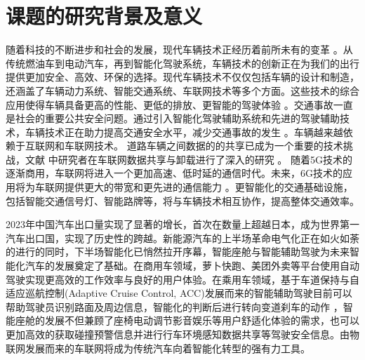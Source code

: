 \section{课题的研究背景及意义}\label{section1-1}

随着科技的不断进步和社会的发展，现代车辆技术正经历着前所未有的变革 \supercite{SystematicSurvey10225497,DeepReinforcement9146378}。从传统燃油车到电动汽车，再到智能化驾驶系统，车辆技术的创新正在为我们的出行提供更加安全、高效、环保的选择。现代车辆技术不仅仅包括车辆的设计和制造，还涵盖了车辆动力系统、智能交通系统、车联网技术等多个方面。这些技术的综合应用使得车辆具备更高的性能、更低的排放、更智能的驾驶体验 \supercite{Autonomous9351818}。交通事故一直是社会的重要公共安全问题。通过引入智能化驾驶辅助系统和先进的驾驶辅助技术，车辆技术正在助力提高交通安全水平，减少交通事故的发生 \supercite{SecurityandPrivacy}。车辆越来越依赖于互联网和车联网技术。
道路车辆之间数据的的共享已成为一个重要的技术挑战，文献 \cite{刘雪娇186}中研究者在车联网数据共享与卸载进行了深入的研究 。
随着5G技术的逐渐商用，车联网将进入一个更加高速、低时延的通信时代。未来，6G技术的应用将为车联网提供更大的带宽和更先进的通信能力 \supercite{6GforVehicle}。更智能化的交通基础设施，包括智能交通信号灯、智能路牌等，将与车辆技术相互协作，提高整体交通效率。

2023年中国汽车出口量实现了显著的增长，首次在数量上超越日本，成为世界第一汽车出口国，实现了历史性的跨越。新能源汽车的上半场革命电气化正在如火如荼的进行的同时，下半场智能化已悄然拉开序幕，智能座舱与智能辅助驾驶为未来智能化汽车的发展奠定了基础。在商用车领域，萝卜快跑、美团外卖等平台使用自动驾驶实现更高效的工作效率与良好的用户体验。在乘用车领域，基于车道保持与自适应巡航控制(Adaptive Cruise Control, ACC)发展而来的智能辅助驾驶目前可以帮助驾驶员识别路面及周边信息，智能化的判断后进行转向变道刹车的动作 \supercite{SurveyofDeep8951131}，智能座舱的发展不但兼顾了座椅电动调节影音娱乐等用户舒适化体验的需求，也可以更加高效的获取碰撞预警信息并进行行车环境感知数据共享等驾驶安全信息。由物联网发展而来的车联网将成为传统汽车向着智能化转型的强有力工具。

